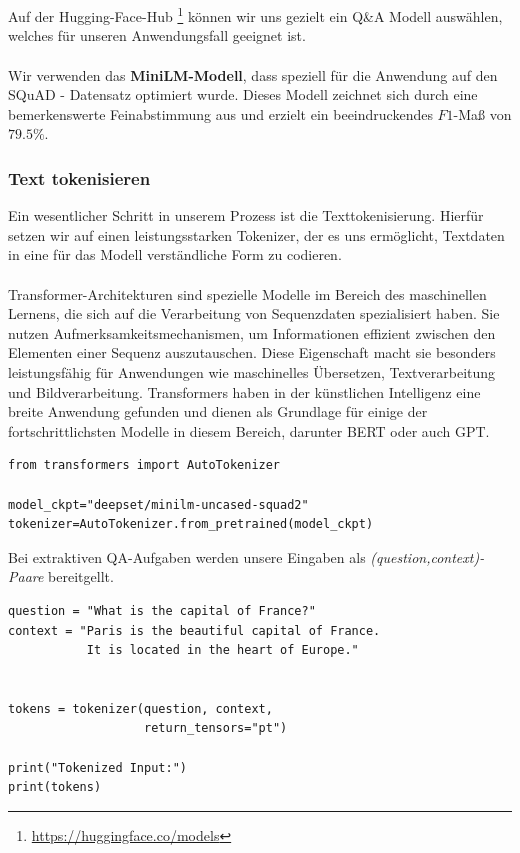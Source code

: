 \documentclass[12pt, a4paper]{article}
\begin{document}
\\ \\
Auf der Hugging-Face-Hub \footnote{\url{https://huggingface.co/models}} können wir uns gezielt ein Q\&A Modell auswählen, welches für unseren Anwendungsfall geeignet ist.
\\ \\
Wir verwenden das \textbf{MiniLM-Modell}, dass speziell für die Anwendung auf den SQuAD - Datensatz optimiert wurde. Dieses Modell zeichnet sich durch eine bemerkenswerte Feinabstimmung aus und erzielt ein beeindruckendes $F1$-Maß von $79.5\%$. 

\subsubsection{Text tokenisieren}
Ein wesentlicher Schritt in unserem Prozess ist die Texttokenisierung. Hierfür setzen wir auf einen leistungsstarken Tokenizer, der es uns ermöglicht, Textdaten in eine für das Modell verständliche Form zu codieren. 
\\ \\
Transformer-Architekturen sind spezielle Modelle im Bereich des maschinellen Lernens, die sich auf die Verarbeitung von Sequenzdaten spezialisiert haben. Sie nutzen Aufmerksamkeitsmechanismen, um Informationen effizient zwischen den Elementen einer Sequenz auszutauschen. Diese Eigenschaft macht sie besonders leistungsfähig für Anwendungen wie maschinelles Übersetzen, Textverarbeitung und Bildverarbeitung. Transformers haben in der künstlichen Intelligenz eine breite Anwendung gefunden und dienen als Grundlage für einige der fortschrittlichsten Modelle in diesem Bereich, darunter BERT oder auch GPT.
\ \\ 
\begin{lstlisting}[style=mystyle, numbers=none]
from transformers import AutoTokenizer

model_ckpt="deepset/minilm-uncased-squad2"
tokenizer=AutoTokenizer.from_pretrained(model_ckpt)
\end{lstlisting}
Bei extraktiven QA-Aufgaben werden unsere Eingaben als   \textit{(question,context)-Paare} bereitgellt.
\\
\begin{lstlisting}[style=mystyle, numbers=none]
question = "What is the capital of France?"
context = "Paris is the beautiful capital of France. 
           It is located in the heart of Europe."


tokens = tokenizer(question, context,
                   return_tensors="pt")

print("Tokenized Input:")
print(tokens)
\end{lstlisting}
\end{document}
